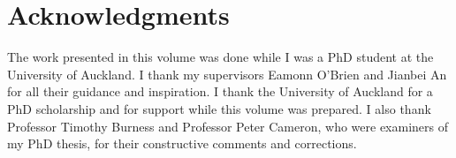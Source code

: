 \chapter*{Acknowledgments}
The work presented in this volume was done while I was a PhD student at the University of Auckland. I thank my supervisors Eamonn O'Brien and Jianbei An for all their guidance and inspiration. I thank the University of Auckland for a PhD scholarship and for support while this volume was prepared. I also thank Professor Timothy  Burness and Professor Peter Cameron, who were  examiners of my PhD thesis, for their constructive comments and corrections.
